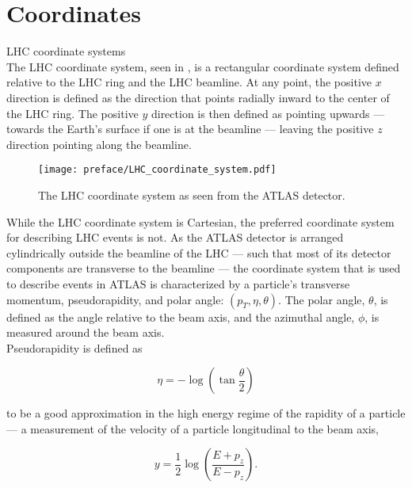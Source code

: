 \section{Coordinates}\label{section:coordinates}

LHC coordinate systems\\

The LHC coordinate system, seen in , is a rectangular coordinate system defined relative to the LHC ring and the LHC beamline.
At any point, the positive $x$ direction is defined as the direction that points radially inward to the center of the LHC ring.
The positive $y$ direction is then defined as pointing upwards --- towards the Earth's surface if one is at the beamline --- leaving the positive $z$ direction pointing along the beamline.\\

\begin{figure}[htbp]
 \centering
 \texttt{[image: preface/LHC\_coordinate\_system.pdf]}
 \caption{The LHC coordinate system as seen from the ATLAS detector.}
 \label{fig:LHC_coordinate_system}
\end{figure}

While the LHC coordinate system is Cartesian, the preferred coordinate system for describing LHC events is not.
As the ATLAS detector is arranged cylindrically outside the beamline of the LHC --- such that most of its detector components are transverse to the beamline --- the coordinate system that is used to describe events in ATLAS is characterized by a particle's transverse momentum, pseudorapidity, and polar angle: $\left(p_T, \eta, \theta\right)$.
The polar angle, $\theta$, is defined as the angle relative to the beam axis, and the azimuthal angle, $\phi$, is measured around the beam axis.\\

\Gls{Pseudorapidity} is defined as

\begin{equation}
 \eta = - \log \left(\tan \frac{\theta}{2}\right)
 \label{eq:pseudorapidity}
\end{equation}

to be a good approximation in the high energy regime of the \gls{rapidity} of a particle --- a measurement of the velocity of a particle longitudinal to the beam axis,

\begin{equation}
 y = \frac{1}{2} \log \left(\frac{E + p_{z}}{E - p_{z}}\right).
 \label{eq:rapidity}
\end{equation}

